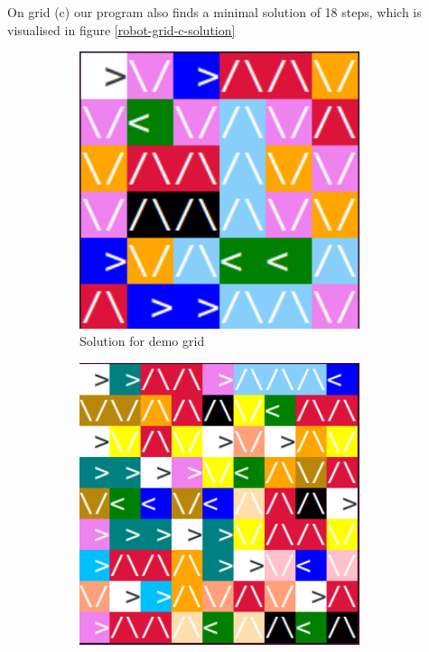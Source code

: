 \documentclass{scrartcl}
\begin{document}
	On grid (c) our program also finds a minimal solution of 18 steps, which is visualised in figure \ref{robot-grid-c-solution}

	\begin{figure}
		\begin{subfigure}{0.5\textwidth}
			\includegraphics[width=0.9\textwidth]{resources/Screenshot from 2022-11-21 12-14-49.png}
			\caption{Solution for demo grid}
			\label{robot-demogrid-solution}
		\end{subfigure}
		\begin{subfigure}{0.5\textwidth}
			\includegraphics[width=0.9\textwidth]{resources/Screenshot from 2022-11-21 12-20-11.png}

\end{subfigure}
\end{figure}
\end{document}
